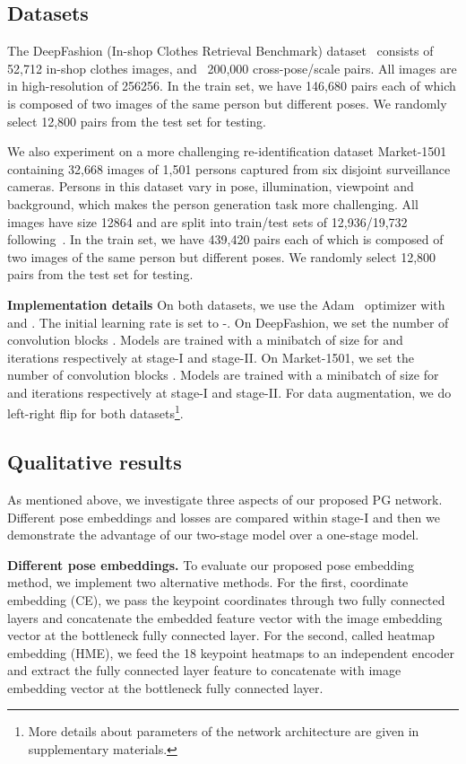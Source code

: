\documentclass{article}
\newcommand{\myparagraph}[1]{\vspace{0.0em}\noindent\textbf{#1}}
\begin{document}
\subsection{Datasets}

The DeepFashion (In-shop Clothes Retrieval Benchmark) dataset~\cite{DeepFashion}
consists of 52,712 in-shop clothes images, and ~200,000 cross-pose/scale pairs. All images are in high-resolution of  256256. 
In the train set, we have 146,680 pairs each of which is composed of two images of the same person but different poses. We randomly select 12,800 pairs from the test set for testing. 

We also experiment on a more challenging re-identification dataset Market-1501~\cite{Market1501}
containing 32,668 images of 1,501 persons captured from six disjoint surveillance cameras. 
Persons in this dataset vary in pose, illumination, viewpoint and background, which makes the person generation task more challenging. All images have size 12864 and are split into train/test sets of 12,936/19,732 following~\cite{Market1501}. In the train set, we have 439,420 pairs each of which is composed of two images of the same person but different poses. We randomly select 12,800 pairs from the test set for testing. 

\myparagraph{Implementation details}
On both datasets, we use the Adam~\cite{Adam} optimizer with  and . The initial learning rate is set to -. 
On DeepFashion, we set the number of convolution blocks . Models are trained with a minibatch of size  for  and  iterations respectively at stage-I and stage-II.
On Market-1501, we set the number of convolution blocks . Models are trained with a minibatch of size  for  and  iterations respectively at stage-I and stage-II. 
For data augmentation, we do left-right flip for both datasets\footnote{More details about parameters of the network architecture are given in supplementary materials.}.


\subsection{Qualitative results}
As mentioned above, we investigate three aspects of our proposed PG network. Different pose embeddings and losses are compared within stage-I and then
we demonstrate the advantage of our two-stage model over a one-stage model.

\myparagraph{Different pose embeddings.} 
To evaluate our proposed pose embedding method, we implement two alternative
methods. For the first, coordinate embedding (CE), we pass the keypoint coordinates  through two fully connected layers and concatenate the embedded feature vector with the image embedding vector at the bottleneck fully connected layer. For the second, called heatmap embedding (HME), we feed the 18 keypoint heatmaps to an independent encoder and extract the fully connected layer feature to concatenate with image embedding vector at the bottleneck fully connected layer.
\end{document}
